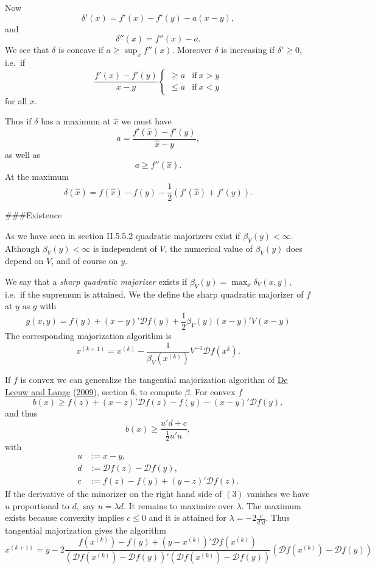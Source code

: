 \documentclass[
  12pt,
]{book}
\begin{document}
Now
\[
\delta'(x)=f'(x)-f'(y)-a(x-y),
\]
and
\[
\delta''(x)=f''(x)-a.
\]
We see that \(\delta\) is concave if \(a\geq\sup_x f''(x)\). Moreover \(\delta\) is increasing
if \(\delta'\geq 0\), i.e.~if
\[
\frac{f'(x)-f'(y)}{x-y}\begin{cases}\geq a&{ \text{if}\ }x>y\\\leq a&{ \text{if}\ }x<y\end{cases}
\]
for all \(x\).

Thus if \(\delta\) has a maximum at \(\hat x\) we must have
\[
a=\frac{f'(\hat x)-f'(y)}{\hat x - y},
\]
as well as
\[
a\geq f''(\hat x).
\]
At the maximum
\[
\delta(\hat x)=f(\hat x)-f(y)-\frac12(f'(\hat x)+f'(y)).
\]

\#\#\#Existence

As we have seen in section II.5.5.2 quadratic majorizers exist if \(\beta_V(y)<\infty.\) Although \(\beta_V(y)<\infty\) is independent of \(V\), the numerical value of \(\beta_V(y)\) does depend on \(V\), and of course on \(y\).

We say that a \emph{sharp quadratic majorizer} exists
if \(\beta_V(y)=\max_x\delta_V(x,y)\), i.e.~if the supremum is attained. We the define the sharp quadratic majorizer of \(f\) at \(y\) as \(g\) with
\[
g(x,y)=f(y)+(x-y)'\mathcal{D}f(y)+\frac12\beta_V(y)(x-y)'V(x-y)
\]
The corresponding majorization algorithm is
\[
x^{(k+1)}=x^{(k)}-\frac{1}{\beta_V(x^{(k)})}V^{-1}\mathcal{D}f(x^{k}).
\]

If \(f\) is convex we can generalize the tangential majorization algorithm of \protect\hyperlink{ref-deleeuw_lange_A_09}{De Leeuw and Lange} (\protect\hyperlink{ref-deleeuw_lange_A_09}{2009}), section 6, to compute \(\beta.\)
For convex \(f\)
\[
b(x)\geq f(z)+(x-z)'\mathcal{D}f(z)-f(y)-(x-y)'\mathcal{D}f(y),
\]
and thus
\[
b(x)\geq \frac {u'd+c}{\frac12 u'u},\tag{3}
\]
with
\begin{align*}
u&:=x-y,\\
d&:=\mathcal{D}f(z)-\mathcal{D}f(y),\\
c&:=f(z)-f(y)+(y-z)'\mathcal{D}f(z).
\end{align*}
If the derivative of the minorizer on the right hand side of \((3)\) vanishes we have \(u\) proportional
to \(d,\) say \(u=\lambda d.\) It remains to maximize
over \(\lambda\).
The maximum exists because convexity implies \(c\leq 0\) and it is attained for \(\lambda=-2\frac{c}{d'd}.\) Thus tangential majorization gives the algorithm
\[
x^{(k+1)}=y-2\frac{f(x^{(k)})-f(y)+(y-x^{(k)})'\mathcal{D}f(x^{(k)})}{(\mathcal{D}f(x^{(k)})-\mathcal{D}f(y))'(\mathcal{D}f(x^{(k)})-\mathcal{D}f(y))}(\mathcal{D}f(x^{(k)})-\mathcal{D}f(y))
\]
\end{document}
